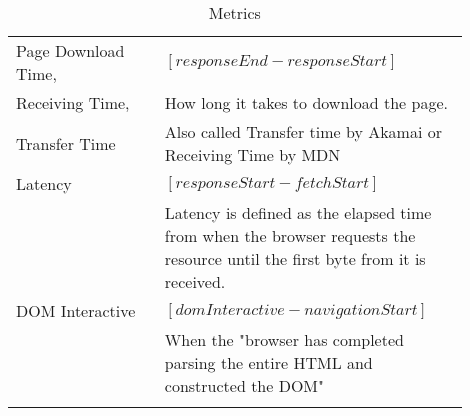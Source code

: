 \begin{center}
\begin{longtable}{ | p{0.3\linewidth} | p{0.6\linewidth} | }
	\hline
	Page Download Time,
	& $[responseEnd - responseStart]$ \\
	Receiving Time,  & How long it takes to download the page. \\
	Transfer Time & Also called Transfer time by Akamai or Receiving Time by MDN \\

	\hline
	Latency
	& $[responseStart - fetchStart]$ \\ 
	& Latency is defined as the elapsed time from when the browser requests the resource until the first byte from it is received.  \\ %

	\hline
	DOM Interactive
	& $[domInteractive - navigationStart]$ \\
	& When the "browser has completed parsing the entire HTML and constructed the DOM" \\ %

	


	\hline
	\caption{Metrics} %
	\label{table:navigation_timing_metrics}
	\end{longtable}
\end{center}


